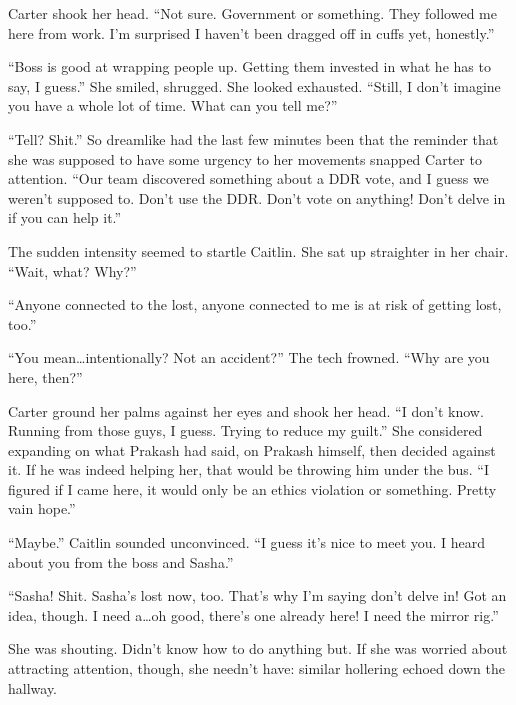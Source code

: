 Carter shook her head. ``Not sure. Government or something. They followed me here from work. I'm surprised I haven't been dragged off in cuffs yet, honestly.''

``Boss is good at wrapping people up. Getting them invested in what he has to say, I guess.'' She smiled, shrugged. She looked exhausted. ``Still, I don't imagine you have a whole lot of time. What can you tell me?''

``Tell? Shit.'' So dreamlike had the last few minutes been that the reminder that she was supposed to have some urgency to her movements snapped Carter to attention. ``Our team discovered something about a DDR vote, and I guess we weren't supposed to. Don't use the DDR. Don't vote on anything! Don't delve in if you can help it.''

The sudden intensity seemed to startle Caitlin. She sat up straighter in her chair. ``Wait, what? Why?''

``Anyone connected to the lost, anyone connected to me is at risk of getting lost, too.''

``You mean\ldots{}intentionally? Not an accident?'' The tech frowned. ``Why are you here, then?''

Carter ground her palms against her eyes and shook her head. ``I don't know. Running from those guys, I guess. Trying to reduce my guilt.'' She considered expanding on what Prakash had said, on Prakash himself, then decided against it. If he was indeed helping her, that would be throwing him under the bus. ``I figured if I came here, it would only be an ethics violation or something. Pretty vain hope.''

``Maybe.'' Caitlin sounded unconvinced. ``I guess it's nice to meet you. I heard about you from the boss and Sasha.''

``Sasha! Shit. Sasha's lost now, too. That's why I'm saying don't delve in! Got an idea, though. I need a\ldots{}oh good, there's one already here! I need the mirror rig.''

She was shouting. Didn't know how to do anything but. If she was worried about attracting attention, though, she needn't have: similar hollering echoed down the hallway.
